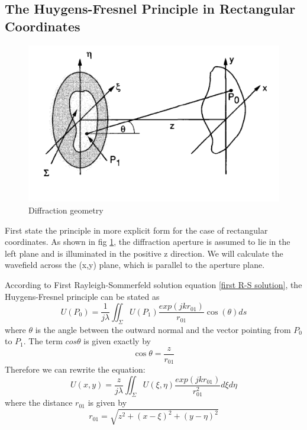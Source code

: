 \documentclass[../main.tex]{subfiles}
\begin{document}
	\subsection{The Huygens-Fresnel Principle in Rectangular Coordinates}
	\begin{figure}[h!]
	  \centering
	  \includegraphics[scale=0.5]{../graphics/Wave_optics5.png}
	  \caption{Diffraction geometry}
	  \label{fig:Coordinates}
	\end{figure}
	First state the principle in more explicit form for the case of rectangular coordinates. As shown in fig \ref{fig:Coordinates}, the diffraction aperture is assumed to lie in the left plane and is illuminated in the positive z direction. We will calculate the wavefield across the (x,y) plane, which is parallel to the aperture plane.

	According to First Rayleigh-Sommerfeld solution equation \ref{first R-S solution}, the Huygens-Fresnel principle can be stated as
	\begin{equation}
	U(P_0)=\frac{1}{j\lambda}\iint_{\Sigma} U(P_1)\frac{exp(jkr_{01})}{r_{01}}\cos(\theta)ds
	\end{equation}
	where $\theta$ is the angle between the outward normal and the vector pointing from $P_0$ to $P_1$. The term $cos\theta$ is given exactly by
	\begin{equation}
	\cos\theta=\frac{z}{r_{01}}
	\end{equation}
	Therefore we can rewrite the equation:
	\begin{equation}
	U(x,y)=\frac{z}{j\lambda}\iint_{\Sigma} U(\xi,\eta)\frac{exp(jkr_{01})}{r^2_{01}}d\xi d\eta\label{Fresnel}
	\end{equation}
	where the distance $r_{01}$ is given by
	\begin{equation}
	r_{01}=\sqrt{z^2+(x-\xi)^2+(y-\eta)^2}
	\end{equation}
\end{document}
